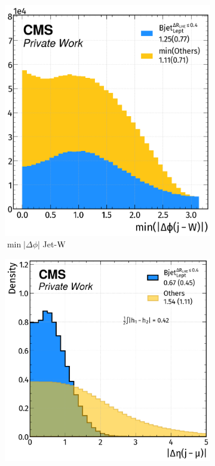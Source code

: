 \begin{figure}[H]
\begin{subfigure}{0.46\linewidth}
        \includegraphics[width=1\linewidth]{fig//chap08-kin_reco/min_dphi_W.png}
        \caption{$\min|\Delta \phi|$ Jet-${\text{W}}$}
    \end{subfigure}  
    \hfill
     \begin{subfigure}{0.49\linewidth}
        \centering
        \includegraphics[width=1\linewidth]{fig//chap08-kin_reco/deta_mu.png}

\end{subfigure}
\end{figure}
